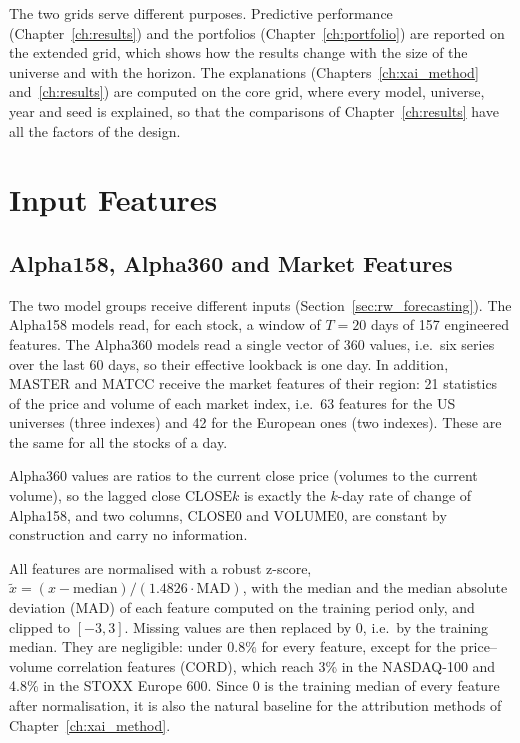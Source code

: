 The two grids serve different purposes. Predictive performance (Chapter~\ref{ch:results}) and the portfolios (Chapter~\ref{ch:portfolio}) are reported on the extended grid, which shows how the results change with the size of the universe and with the horizon. The explanations (Chapters~\ref{ch:xai_method} and~\ref{ch:results}) are computed on the core grid, where every model, universe, year and seed is explained, so that the comparisons of Chapter~\ref{ch:results} have all the factors of the design. %

\section{Input Features}
\label{sec:data_features}

\subsection{Alpha158, Alpha360 and Market Features}

The two model groups receive different inputs (Section~\ref{sec:rw_forecasting}). The Alpha158 models read, for each stock, a window of $T = 20$ days of 157 engineered features. The Alpha360 models read a single vector of 360 values, i.e.\ six series over the last 60 days, so their effective lookback is one day. In addition, MASTER and MATCC receive the market features of their region: 21 statistics of the price and volume of each market index, i.e.\ 63 features for the US universes (three indexes) and 42 for the European ones (two indexes). These are the same for all the stocks of a day.

Alpha360 values are ratios to the current close price (volumes to the current volume), so the lagged close $\mathrm{CLOSE}k$ is exactly the $k$-day rate of change of Alpha158, and two columns, $\mathrm{CLOSE0}$ and $\mathrm{VOLUME0}$, are constant by construction and carry no information.

All features are normalised with a robust z-score, $\tilde{x} = (x - \mathrm{median}) / (1.4826 \cdot \mathrm{MAD})$, with the median and the median absolute deviation (MAD) of each feature computed on the training period only, and clipped to $[-3, 3]$. Missing values are then replaced by 0, i.e.\ by the training median. They are negligible: under 0.8\% for every feature, except for the price--volume correlation features (CORD), which reach 3\% in the NASDAQ-100 and 4.8\% in the STOXX Europe 600. Since 0 is the training median of every feature after normalisation, it is also the natural baseline for the attribution methods of Chapter~\ref{ch:xai_method}.


